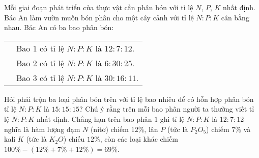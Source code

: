 \begin{bt}
	Mỗi giai đoạn phát triển của thực vật cần phân bón với tỉ lệ $N$, $P$, $K$ nhất định. Bác An làm vườn muốn bón phân cho một cây cảnh với tỉ lệ $N:P:K$ cân bằng nhau. Bác An có ba bao phân bón:
	\begin{center}
		\begin{tabular}{ll}
			& Bao $1$ có tỉ lệ $N:P:K$ là $12:7:12$.\\
			& Bao $2$ có tỉ lệ $N:P:K$ là $6:30:25$.\\
			& Bao $3$ có tỉ lệ $N:P:K$ là $30:16:11$.
		\end{tabular}
	\end{center}
	Hỏi phải trộn ba loại phân bón trên với tỉ lệ bao nhiêu để có hỗn hợp phân bón tỉ lệ $N:P:K$ là $15:15:15$?
	Chú ý rằng trên mỗi bao phân người ta thường viết tỉ lệ $N:P:K$ nhất định. Chẳng hạn trên bao phân $1$ ghi tỉ lệ $N:P:K$ là $12:7:12$ nghĩa là hàm lượng đạm $N$ (nitơ) chiếm $12 \%$, lân $P$ (tức là $P_2O_5$) chiếm $7 \%$ và kali $K$ (tức là $K_2O$) chiếu $12\%$, còn các loại khác chiếm $100\%-(12\%+7\%+12\%)=69\%$.
\end{bt}

